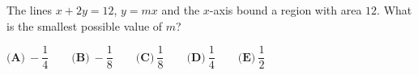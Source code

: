 The lines $x+2y=12$, $y=mx$ and the $x$-axis bound a region with area $12$. What is the smallest possible value of $m$?

$\textbf{(A)}\ -\dfrac{1}{4}\qquad\textbf{(B)}\ -\dfrac{1}{8}\qquad\textbf{(C)}\ \dfrac{1}{8}\qquad\textbf{(D)}\ \dfrac{1}{4} \qquad \textbf{(E)}\ \dfrac{1}{2}$
